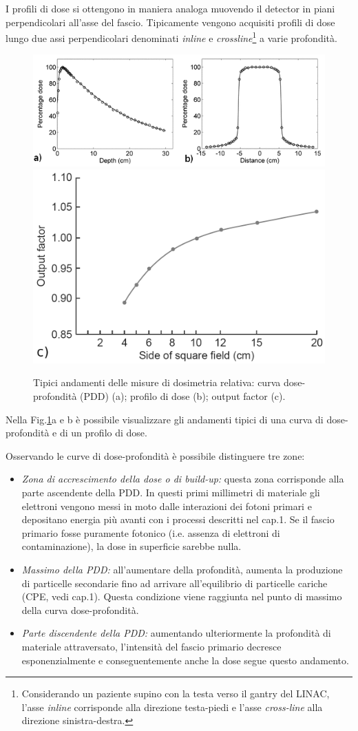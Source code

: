 I profili di dose si ottengono in maniera analoga muovendo il detector in piani perpendicolari all'asse del fascio. Tipicamente vengono acquisiti profili di dose lungo due assi perpendicolari denominati \textit{inline} e \textit{crossline}\footnote{Considerando un paziente supino con la testa verso il gantry del LINAC, l'asse \textit{inline} corrisponde alla direzione testa-piedi e l'asse \textit{cross-line} alla direzione sinistra-destra.} a varie profondità.\\
\begin{figure}
\centering
\includegraphics[width=\textwidth]{./cap2/pdd_prof.png}\\
\includegraphics[width=.5\textwidth]{./cap2/of.png}
\caption{Tipici andamenti delle misure di dosimetria relativa: curva dose-profondità (PDD) (a); profilo di dose (b); output factor (c).}
\label{fig:pdd_prof}
\end{figure}
Nella Fig.\ref{fig:pdd_prof}a e b è possibile visualizzare gli andamenti tipici di una curva di dose-profondità e di un profilo di dose.

Osservando le curve di dose-profondità è possibile distinguere tre zone:
\begin{itemize}
\item \textit{Zona di accrescimento della dose o di build-up:} questa zona corrisponde alla parte ascendente della PDD. In questi primi millimetri di materiale gli elettroni vengono messi in moto dalle interazioni dei fotoni primari e depositano energia più avanti con i processi descritti nel cap.1. Se il fascio primario fosse puramente fotonico (i.e. assenza di elettroni di contaminazione), la dose in superficie sarebbe nulla.
\item \textit{Massimo della PDD:} all'aumentare della profondità, aumenta la produzione di particelle secondarie fino ad arrivare all'equilibrio di particelle cariche (CPE, vedi cap.1). Questa condizione viene raggiunta nel punto di massimo della curva dose-profondità.
\item \textit{Parte discendente della PDD:} aumentando ulteriormente la profondità di materiale attraversato, l'intensità del fascio primario decresce esponenzialmente e conseguentemente anche la dose segue questo andamento.
\end{itemize}

